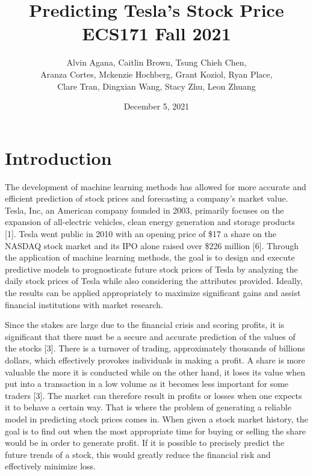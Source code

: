 \documentclass[12pt,a4paper]{article}
\begin{document}
\title{Predicting Tesla's Stock Price\\
	\large ECS171 Fall 2021}
\author{Alvin Agana, Caitlin Brown, Tsung Chieh Chen, \\Aranza Cortes, Mckenzie Hochberg, Grant Koziol, Ryan Place, \\Clare Tran, Dingxian Wang, Stacy Zhu, Leon Zhuang}
\date{December 5, 2021}
\maketitle
\pagestyle{fancy}
\fancyhf{}
\tableofcontents
\newpage
{}



\section{Introduction}
The development of machine learning methods has allowed for more accurate and efficient prediction of stock prices and forecasting a company’s market value. Tesla, Inc, an American company founded in 2003, primarily focuses on the expansion of all-electric vehicles, clean energy generation and storage products [1]. Tesla went public in 2010 with an opening price of \$17 a share on the NASDAQ stock market and its IPO alone raised over \$226 million [6]. Through the application of machine learning methods, the goal is to design and execute predictive models to prognosticate future stock prices of Tesla by analyzing the daily stock prices of Tesla while also considering the attributes provided. Ideally, the results can be applied appropriately to maximize significant gains and assist financial institutions with market research. 

Since the stakes are large due to the financial crisis and scoring profits, it is significant that there must be a secure and accurate prediction of the values of the stocks [3]. There is a turnover of trading, approximately thousands of billions dollars, which effectively provokes individuals in making a profit. A share is more valuable the more it is conducted while on the other hand, it loses its value when put into a transaction in a low volume as it becomes less important for some traders [3]. The market can therefore result in profits or losses when one expects it to behave a certain way. That is where the problem of generating a reliable model in predicting stock prices comes in. When given a stock market history, the goal is to find out when the most appropriate time for buying or selling the share would be in order to generate profit. If it is possible to precisely predict the future trends of a stock, this would greatly reduce the financial risk and effectively minimize loss. 
\end{document}
